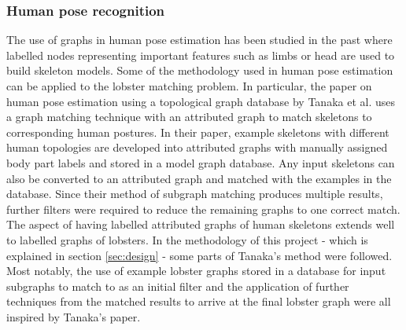 \subsubsection{Human pose recognition}
The use of graphs in human pose estimation has been studied in the past
\cite{human-pose, human-skeleton} where labelled nodes representing important features such as limbs or head are used to build skeleton models.
\n
Some of the methodology used in human pose estimation can be applied to the lobster matching problem. In particular, the paper on human pose estimation using a topological graph database by Tanaka et al. \cite{human-pose} uses a graph matching technique with an attributed graph to match skeletons to corresponding human postures. In their paper, example skeletons with different human topologies are developed into attributed graphs with manually assigned body part labels and stored in a model graph database. Any input skeletons can  also be converted to an attributed graph and matched with the examples in the database. Since their method of subgraph matching produces multiple results, further filters were required to reduce the remaining graphs to one correct match. 
\noindent
The aspect of having labelled attributed graphs of human skeletons extends well to labelled graphs of lobsters. In the methodology of this project - which is explained in section \ref{sec:design} - some parts of Tanaka's method were followed. Most notably, the use of example lobster graphs stored in a database for input subgraphs to match to as an initial filter and the application of further techniques from the matched results to arrive at the final lobster graph were all inspired by Tanaka's paper.
 
